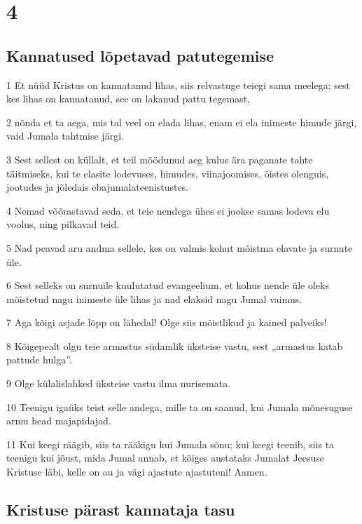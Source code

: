 \chapter{4}

\section*{Kannatused lõpetavad patutegemise}

\par 1 Et nüüd Kristus on kannatanud lihas, siis relvastuge teiegi sama meelega; sest kes lihas on kannatanud, see on lakanud pattu tegemast,
\par 2 nõnda et ta aega, mis tal veel on elada lihas, enam ei ela inimeste himude järgi, vaid Jumala tahtmise järgi.
\par 3 Sest sellest on küllalt, et teil möödunud aeg kulus ära paganate tahte täitmiseks, kui te elasite lodevuses, himudes, viinajoomises, öistes olenguis, jootudes ja jõledais ebajumalateenistustes.
\par 4 Nemad võõrastavad seda, et teie nendega ühes ei jookse samas lodeva elu voolus, ning pilkavad teid.
\par 5 Nad peavad aru andma sellele, kes on valmis kohut mõistma elavate ja surnute üle.
\par 6 Sest selleks on surnuile kuulutatud evangeelium, et kohus nende üle oleks mõistetud nagu inimeste üle lihas ja nad elaksid nagu Jumal vaimus.
\par 7 Aga kõigi asjade lõpp on lähedal! Olge siis mõistlikud ja kained palveiks!
\par 8 Kõigepealt olgu teie armastus südamlik üksteise vastu, sest „armastus katab pattude hulga”.
\par 9 Olge külalislahked üksteise vastu ilma nurisemata.
\par 10 Teenigu igaüks teist selle andega, mille ta on saanud, kui Jumala mõnesuguse armu head majapidajad.
\par 11 Kui keegi räägib, siis ta rääkigu kui Jumala sõnu; kui keegi teenib, siis ta teenigu kui jõust, mida Jumal annab, et kõiges austataks Jumalat Jeesuse Kristuse läbi, kelle on au ja vägi ajastute ajastuteni! Aamen.

\section*{Kristuse pärast kannataja tasu}

